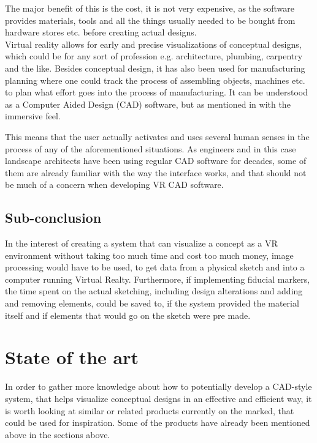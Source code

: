 	The major benefit of this is the cost, it is not very expensive, as the software provides materials, tools and all the things usually needed to be bought from hardware stores etc. before creating actual designs. \\ 
	
	Virtual reality allows for early and precise visualizations of conceptual designs, which could be for any sort of profession e.g. architecture, plumbing, carpentry and the like. Besides conceptual design, it has also been used for manufacturing planning where one could track the process of assembling objects, machines etc. to plan what effort goes into the process of manufacturing. It can be understood as a Computer Aided Design (CAD) software, but as mentioned in \cite{engineeringVR} with the immersive feel. 
	
	This means that the user actually activates and uses several human senses in the process of any of the aforementioned situations. As engineers and in this case landscape architects have been using regular CAD software for decades, some of them are already familiar with the way the interface works, and that should not be much of a concern when developing VR CAD software.

	\subsection{Sub-conclusion}
	In the interest of creating a system that can visualize a concept as a VR environment without taking too much time and cost too much money, image processing would have to be used, to get data from a physical sketch and into a computer running Virtual Realty. Furthermore, if implementing fiducial markers, the time spent on the actual sketching, including design alterations and adding and removing elements, could be saved to, if the system provided the material itself and if elements that would go on the sketch were pre made.

    \section{State of the art}\label{sec:SOTA}
    In order to gather more knowledge about how to potentially develop a CAD-style system, that helps visualize conceptual designs in an effective and efficient way, it is worth looking at similar or related products currently on the marked, that could be used for inspiration. Some of the products have already been mentioned above in the sections above.
	  
